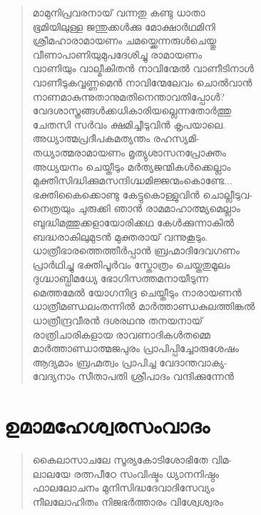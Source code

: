 \begin{verse}
മാമുനിപ്രവരനായ് വന്നതു കണ്ടു ധാതാ\\
ഭൂമിയിലുള്ള ജന്തുക്കള്‍ക്കു മോക്ഷാര്‍ഥമിനി\\
ശ്രീമഹാരാമായണം ചമയ്ക്കെന്നരുള്‍ചെയ്തു\\
വീണാപാണിയുമുപദേശിച്ചു രാമായണം\\
വാണിയും വാല്മീകിതന്‍ നാവിന്മേല്‍ വാണീടിനാള്‍\\
വാണീടുകവ്വണ്ണമെന്‍ നാവിന്മേലേവം ചൊല്‍വാന്‍\\
നാണമാകുന്നുതാനുമതിനെന്താവതിപ്പോള്‍?\\
വേദശാസ്ത്രങ്ങള്‍ക്കധികാരിയല്ലെന്നതോര്‍ത്തു\\
ചേതസി സര്‍വം ക്ഷമിച്ചീടുവിന്‍ കൃപയാലെ.\\
അധ്യാത്മപ്രദീപകമത്യന്തം രഹസ്യമി-\\
തധ്യാത്മരാമായണം മൃത്യുശാസനപ്രോക്തം\\
അധ്യയനം ചെയ്തീടും മര്‍ത്യജന്മികള്‍ക്കെല്ലാം\\
മുക്തിസിദ്ധിക്കുമസന്ദിഗ്ദ്ധമിജ്ജന്മംകൊണ്ടേ...\\
ഭക്തികൈക്കൊണ്ടു കേട്ടുകൊള്ളുവിന്‍ ചൊല്ലീടുവ-\\
നെത്രയും ചുരുക്കി ഞാന്‍ രാമമാഹാത്മ്യമെല്ലാം\\
ബുദ്ധിമത്തുക്കളായോരിക്കഥ കേള്‍ക്കുന്നാകില്‍\\
ബദ്ധരാകിലുമുടന്‍ മുക്തരായ് വന്നുകൂടും.\\
ധാത്രീഭാരത്തെത്തീര്‍പ്പാന്‍ ബ്രഹ്മാദിദേവഗണം\\
പ്രാര്‍ഥിച്ചു ഭക്തിപൂര്‍വം സ്തോത്രം ചെയ്തതുമൂലം\\
ദുഗ്ദ്ധാബ്ധിമധ്യേ ഭോഗിസത്തമനായീടുന്ന\\
മെത്തമേല്‍ യോഗനിദ്ര ചെയ്തീടും നാരായണന്‍\\
ധാത്രീമണ്ഡലംതന്നില്‍ മാര്‍ത്താണ്ഡകുലത്തിങ്കല്‍\\
ധാത്രീന്ദ്രവീരന്‍ ദശരഥനു തനയനായ്\\
രാത്രിചാരികളായ രാവണാദികള്‍തമ്മെ\\
മാര്‍ത്താണ്ഡാത്മജപുരം പ്രാപിപ്പിച്ചോരുശേഷം\\
ആദ്യമാം ബ്രഹ്മത്വം പ്രാപിച്ച വേദാന്തവാക്യ-\\
വേദ്യനാം സീതാപതി ശ്രീപാദം വന്ദിക്കുന്നേന്‍
\end{verse}

\section{ഉമാമഹേശ്വരസംവാദം}

\begin{verse}
കൈലാസാചലേ സൂര്യകോടിശോഭിതേ വിമ-\\
ലാലയേ രത്നപീഠേ സംവിഷ്ടം ധ്യാനനിഷ്ഠം\\
ഫാലലോചനം മുനിസിദ്ധദേവാദിസേവ്യം\\
നീലലോഹിതം നിജഭര്‍ത്താരം വിശ്വേശ്വരം
\end{verse}

